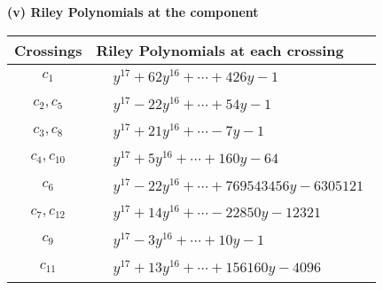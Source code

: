 \documentclass[1p]{elsarticle_modified}
\theoremstyle{definition}
\begin{document}
\newpage\renewcommand{\arraystretch}{1}
\flushleft \textbf{(v) Riley Polynomials at the component}\newline \\
\begin{tabular}{m{50pt}|m{274pt}}
Crossings & \hspace{64pt}Riley Polynomials at each crossing \\
\hline $$\begin{aligned}c_{1}\end{aligned}$$&$\begin{aligned}
&y^{17}+62 y^{16}+\cdots+426 y-1
\end{aligned}$\\
\hline $$\begin{aligned}c_{2},c_{5}\end{aligned}$$&$\begin{aligned}
&y^{17}-22 y^{16}+\cdots+54 y-1
\end{aligned}$\\
\hline $$\begin{aligned}c_{3},c_{8}\end{aligned}$$&$\begin{aligned}
&y^{17}+21 y^{16}+\cdots-7 y-1
\end{aligned}$\\
\hline $$\begin{aligned}c_{4},c_{10}\end{aligned}$$&$\begin{aligned}
&y^{17}+5 y^{16}+\cdots+160 y-64
\end{aligned}$\\
\hline $$\begin{aligned}c_{6}\end{aligned}$$&$\begin{aligned}
&y^{17}-22 y^{16}+\cdots+769543456 y-6305121
\end{aligned}$\\
\hline $$\begin{aligned}c_{7},c_{12}\end{aligned}$$&$\begin{aligned}
&y^{17}+14 y^{16}+\cdots-22850 y-12321
\end{aligned}$\\
\hline $$\begin{aligned}c_{9}\end{aligned}$$&$\begin{aligned}
&y^{17}-3 y^{16}+\cdots+10 y-1
\end{aligned}$\\
\hline $$\begin{aligned}c_{11}\end{aligned}$$&$\begin{aligned}
&y^{17}+13 y^{16}+\cdots+156160 y-4096
\end{aligned}$\\
\hline
\end{tabular}\\~\\
\end{document}
